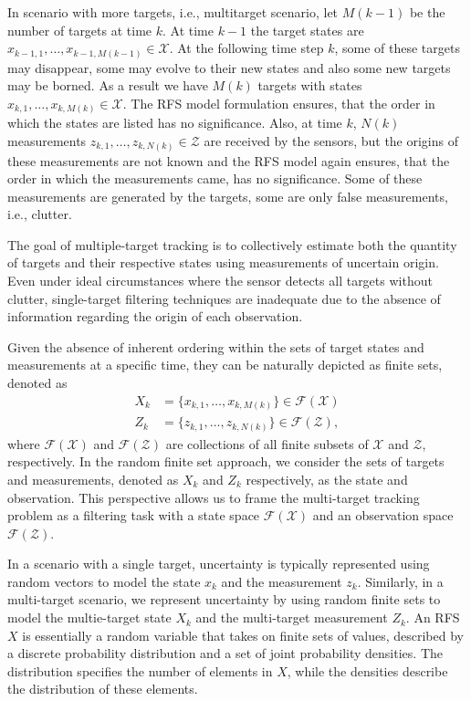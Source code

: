 In scenario with more targets, i.e., multitarget scenario, let $M(k-1)$ be the number of targets at time $k$. At time $k-1$ the target states are $x_{k-1,1}, \dots, x_{k-1,M(k-1)} \in \mathcal{X}$. At the following time step $k$, some of these targets may disappear, some may evolve to their new states and also some new targets may be borned. As a result we have $M(k)$ targets with states $x_{k,1},\dots, x_{k,M(k)} \in \mathcal{X}$. The RFS model formulation ensures, that the order in which the states are listed has no significance. Also, at time $k$, $N(k)$ measurements $z_{k,1},\dots,z_{k,N(k)} \in \mathcal{Z}$ are received by the sensors, but the origins of these measurements are not known and the RFS model again ensures, that the order in which the measurements came, has no significance. Some of these measurements are generated by the targets, some are only false measurements, i.e., clutter.

The goal of multiple-target tracking is to collectively estimate both the quantity of targets and their respective states using measurements of uncertain origin. Even under ideal circumstances where the sensor detects all targets without clutter, single-target filtering techniques are inadequate due to the absence of information regarding the origin of each observation.

Given the absence of inherent ordering within the sets of target states and measurements at a specific time, they can be naturally depicted as finite sets, denoted as
\begin{align}
    X_k &= \{x_{k,1},\dots, x_{k,M(k)}\} \in \mathcal{F}(\mathcal{X}) \\
    Z_k &= \{z_{k,1},\dots, z_{k,N(k)}\} \in \mathcal{F}(\mathcal{Z}),
\end{align}
where $\mathcal{F}(\mathcal{X})$ and $\mathcal{F}(\mathcal{Z})$ are collections of all finite subsets of $\mathcal{X}$ and $\mathcal{Z}$, respectively. In the random finite set approach, we consider the sets of targets and measurements, denoted as $X_k$ and $Z_k$ respectively, as the state and observation. This perspective allows us to frame the multi-target tracking problem as a filtering task with a state space $\mathcal{F}(\mathcal{X})$ and an observation space $\mathcal{F}(\mathcal{Z})$.

In a scenario with a single target, uncertainty is typically represented using random vectors to model the state $x_k$ and the measurement $z_k$. Similarly, in a multi-target scenario, we represent uncertainty by using random finite sets to model the multie-target state $X_k$ and the multi-target measurement $Z_k$. An RFS $X$ is essentially a random variable that takes on finite sets of values, described by a discrete probability distribution and a set of joint probability densities. The distribution specifies the number of elements in $X$, while the densities describe the distribution of these elements.

